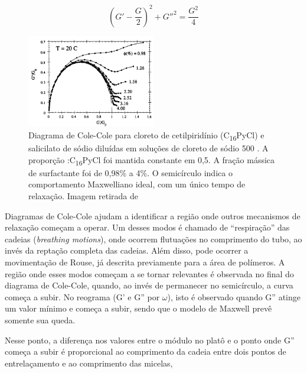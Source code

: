 		\begin{equation}
			\left(G' - \frac{G}{2}\right)^2 + G''^2 = \frac{G^2}{4}
			\label{eqn:cole_cole}
		\end{equation} 
		
		\begin{figure}[h]
			\centering
			\includegraphics[width=0.5\textwidth]{imagens/artigos/ColeCole_Berret_Appel_Porte_1993}
			\caption{Diagrama de Cole-Cole para cloreto de cetilpiridínio (C\textsubscript{16}PyCl) e salicilato de sódio diluídas em soluções de cloreto de sódio 500 \mM. A proporção \Sal:C\textsubscript{16}PyCl foi mantida constante em 0,5. A fração mássica de surfactante foi de 0,98\% a 4\%. O semicírculo indica o comportamento Maxwelliano ideal, com um único tempo de relaxação. Imagem retirada de \citeauthor{Berret1993a}}
			\label{fig:colecole_berret}
		\end{figure}

		 
		
		Diagramas de Cole-Cole ajudam a identificar a região onde outros mecanismos de relaxação começam a operar. Um desses modos é chamado de ``respiração'' das cadeias (\emph{breathing motions}), onde ocorrem flutuações no comprimento do tubo, ao invés da reptação completa das cadeias. Além disso, pode ocorrer a movimentação de Rouse, já descrita previamente para a área de polímeros. \cite{Granek1992}
		A região onde esses modos começam a se tornar relevantes é observada no final do diagrama de Cole-Cole, quando, ao invés de permanecer no semicírculo, a curva começa a subir. No reograma (G' e G'' por \(\omega\)), isto é observado quando G'' atinge um valor mínimo e começa a subir, sendo que o modelo de Maxwell prevê somente sua queda.
		
		Nesse ponto, a diferença nos valores entre o módulo no platô e o ponto onde G'' começa a subir é proporcional ao comprimento da cadeia entre dois pontos de entrelaçamento e ao comprimento das micelas, \cite{Berret1993a} 
		

